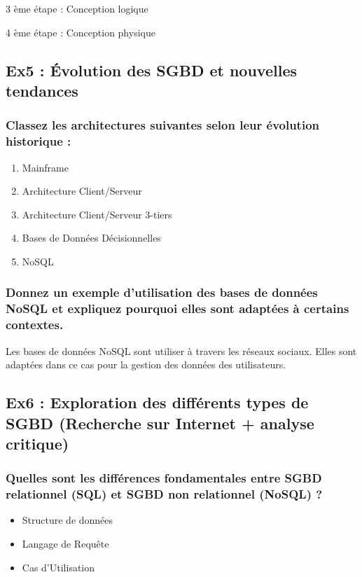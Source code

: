 \documentclass{article}
\begin{document}
3 ème étape : Conception logique        %
 
4 ème étape : Conception physique       %

\subsection{Ex5 : Évolution des SGBD et nouvelles tendances}
\subsubsection{Classez les architectures suivantes selon leur évolution historique :}
\begin{enumerate}
  \item Mainframe  
  \item Architecture Client/Serveur  
  \item Architecture Client/Serveur 3-tiers  
  \item Bases de Données Décisionnelles 
  \item NoSQL 
\end{enumerate}

\subsubsection{Donnez un exemple d’utilisation des bases de données NoSQL et expliquez pourquoi elles sont adaptées à certains contextes.}
Les bases de données NoSQL sont utiliser à travers les réseaux sociaux. Elles sont adaptées dans ce 
cas pour la gestion des données des utilisateurs.  

\subsection{Ex6 : Exploration des différents types de SGBD (Recherche sur Internet + analyse critique)}
\subsubsection{Quelles sont les différences fondamentales entre SGBD relationnel (SQL) et SGBD non 
relationnel (NoSQL) ?}
 
\begin{itemize}
  \item Structure de données  
  \item Langage de Requête 
  \item Cas d’Utilisation 
\end{itemize}
\end{document}
